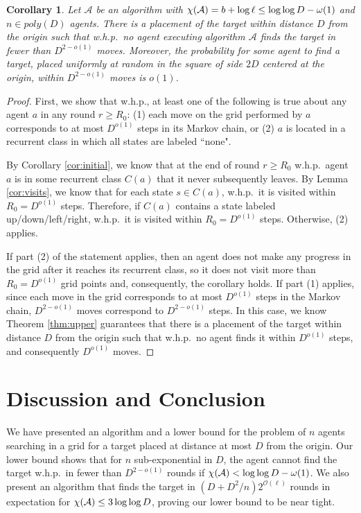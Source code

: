 \documentclass[11pt]{article}
\newtheorem{corollary}[theorem]{Corollary}
\newcommand{\BO}{\mathcal{O}}
\begin{document}
\begin{corollary}
\label{cor:moves}
	Let $\mathcal{A}$ be an algorithm with $\chi({\cal A}) = b + \log \ell \leq \log \log D-\omega(1)$ and $n \in poly(D)$ agents. There is a placement of the target within distance $D$ from the origin such that w.h.p.\ no agent executing algorithm $\mathcal{A}$ finds the target in fewer than $D^{2-o(1)}$ moves.
	Moreover, the probability for some agent to find a target, placed uniformly at random in the square of side $2D$ centered at the origin, within $D^{2-o(1)}$ moves is $o(1)$.
\end{corollary}
\begin{proof}
	First, we show that w.h.p., at least one of the following is true about any agent $a$ in any round $r \geq R_0$: (1) each move on the grid performed by $a$ corresponds to at most $D^{o(1)}$ steps in its Markov chain, or (2) $a$ is located in a recurrent class in which all states are labeled ``none".
	
	By Corollary \ref{cor:initial}, we know that at the end of round $r \geq R_0$ w.h.p.\ agent $a$ is in some recurrent class $C(a)$ that it never subsequently leaves. By Lemma \ref{cor:visits}, we know that for each state $s \in C(a)$, w.h.p.\ it is visited within $R_0 = D^{o(1)}$ steps. Therefore, if $C(a)$ contains a state labeled up/down/left/right, w.h.p.\ it is visited within $R_0 = D^{o(1)}$ steps. Otherwise, (2) applies. 
	
	If part (2) of the statement applies, then an agent does not make any progress in the grid after it reaches its recurrent class, so it does not visit more than $R_0 = D^{o(1)}$ grid points and, consequently, the corollary holds. If part (1) applies, since each move in the grid corresponds to at most $D^{o(1)}$ steps in the Markov chain, $D^{2-o(1)}$ moves correspond to $D^{2-o(1)}$ steps. In this case, we know Theorem \ref{thm:upper} guarantees that there is a placement of the target within distance $D$ from the origin such that w.h.p.\ no agent finds it within $D^{o(1)}$ steps, and consequently $D^{o(1)}$ moves.
\end{proof}



\section{Discussion and Conclusion}
\label{sec:discussion}

We have presented an algorithm and a lower bound for the problem of $n$ agents searching in a grid for a target placed at distance at most $D$ from the origin. Our lower bound shows that for $n$ sub-exponential in $D$, the agent cannot find the target w.h.p.\ in fewer than $D^{2-o(1)}$ rounds if $\chi({\cal A}) < \log \log D - \omega(1)$. We also present an algorithm that finds the target in $(D+D^2/n) 2^{\BO(\ell)}$ rounds in expectation for $\chi({\cal A}) \leq 3 \log \log D$, proving our lower bound to be near tight.
\end{document}
